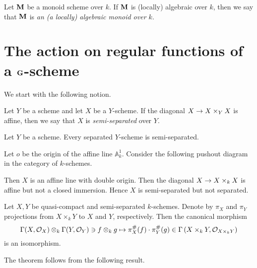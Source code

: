 \begin{definition}
Let $\mathbf{M}$ be a monoid scheme over $k$. If $\mathbf{M}$ is (locally) algebraic over $k$, then we say that $\mathbf{M}$ is \textit{an (a locally) algebraic monoid over $k$}.
\end{definition}

\section{The action on regular functions of a $\mathbf{G}$-scheme}
\noindent
We start with the following notion.

\begin{definition}
Let $Y$ be a scheme and let $X$ be a $Y$-scheme. If the diagonal $X\rightarrow X\times_Y X$ is affine, then we say that $X$ is \textit{semi-separated} over $Y$.
\end{definition}

\begin{remark}\label{remark:separated_is_semi-separated}
Let $Y$ be a scheme. Every separated $Y$-scheme is semi-separated.
\end{remark}

\begin{example}
Let $o$ be the origin of the affine line $\mathbb{A}^1_k$. Consider the following pushout diagram in the category of $k$-schemes.
\begin{center}
\end{center}
Then $X$ is an affine line with double origin. Then the diagonal $X\rightarrow X\times_k X$ is affine but not a closed immersion. Hence $X$ is semi-separated but not separated.
\end{example}

\begin{theorem}\label{theorem:regular_functions_on_products}
Let $X,Y$ be quasi-compact and semi-separated $k$-schemes. Denote by $\pi_X$ and $\pi_Y$ projections from $X\times_kY$ to $X$ and $Y$, respectively. Then the canonical morphism
$$\Gamma(X,{\mathcal O}_X)\otimes_k\Gamma(Y,{\mathcal O}_Y)\ni f\otimes_k g\mapsto \pi_X^{\#}(f)\cdot \pi_Y^{\#}(g)\in \Gamma\left(X\times_kY,{\mathcal O}_{X\times_kY}\right)$$
is an isomorphism.
\end{theorem}
\noindent
The theorem follows from the following result.

